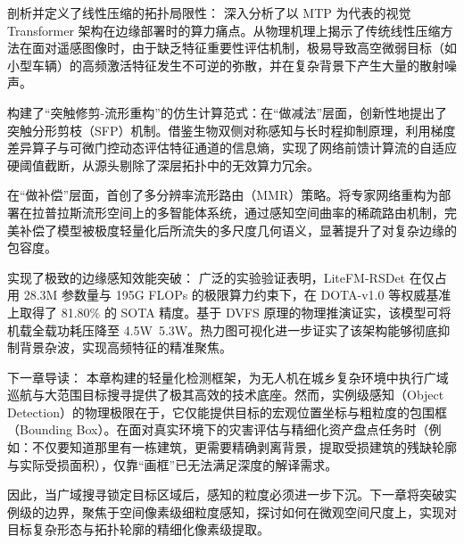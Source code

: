 剖析并定义了线性压缩的拓扑局限性： 深入分析了以 MTP 为代表的视觉 Transformer 架构在边缘部署时的算力痛点。从物理机理上揭示了传统线性压缩方法在面对遥感图像时，由于缺乏特征重要性评估机制，极易导致高空微弱目标（如小型车辆）的高频激活特征发生不可逆的弥散，并在复杂背景下产生大量的散射噪声。

构建了“突触修剪-流形重构”的仿生计算范式：在“做减法”层面，创新性地提出了突触分形剪枝（SFP）机制。借鉴生物双侧对称感知与长时程抑制原理，利用梯度差异算子与可微门控动态评估特征通道的信息熵，实现了网络前馈计算流的自适应硬阈值截断，从源头剔除了深层拓扑中的无效算力冗余。

在“做补偿”层面，首创了多分辨率流形路由（MMR）策略。将专家网络重构为部署在拉普拉斯流形空间上的多智能体系统，通过感知空间曲率的稀疏路由机制，完美补偿了模型被极度轻量化后所流失的多尺度几何语义，显著提升了对复杂边缘的包容度。

实现了极致的边缘感知效能突破： 广泛的实验验证表明，LiteFM-RSDet 在仅占用 28.3M 参数量与 195G FLOPs 的极限算力约束下，在 DOTA-v1.0 等权威基准上取得了 81.80\% 的 SOTA 精度。基于 DVFS 原理的物理推演证实，该模型可将机载全载功耗压降至 4.5W~5.3W。热力图可视化进一步证实了该架构能够彻底抑制背景杂波，实现高频特征的精准聚焦。

下一章导读：
本章构建的轻量化检测框架，为无人机在城乡复杂环境中执行广域巡航与大范围目标搜寻提供了极其高效的技术底座。然而，实例级感知（Object Detection）的物理极限在于，它仅能提供目标的宏观位置坐标与粗粒度的包围框（Bounding Box）。在面对真实环境下的灾害评估与精细化资产盘点任务时（例如：不仅要知道那里有一栋建筑，更需要精确剥离背景，提取受损建筑的残缺轮廓与实际受损面积），仅靠“画框”已无法满足深度的解译需求。

因此，当广域搜寻锁定目标区域后，感知的粒度必须进一步下沉。下一章将突破实例级的边界，聚焦于空间像素级细粒度感知，探讨如何在微观空间尺度上，实现对目标复杂形态与拓扑轮廓的精细化像素级提取。
